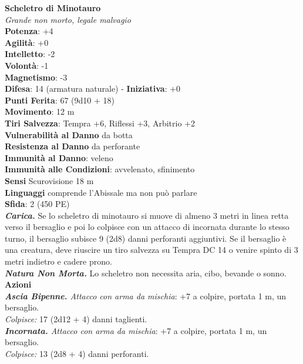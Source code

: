 \begin{multicols}{2}
\medskip\textbf{Scheletro di Minotauro}\\
\emph{Grande non morto, legale malvagio}\\
\textbf{Potenza}: +4\\
\textbf{Agilità}: +0\\
\textbf{Intelletto}: -2\\
\textbf{Volontà}: -1\\
\textbf{Magnetismo}: -3\\
\textbf{Difesa}: 14 (armatura naturale) - \textbf{Iniziativa}: +0\\
\textbf{Punti Ferita}: 67 (9d10 + 18)\\
\textbf{Movimento}: 12 m\\
\textbf{Tiri Salvezza}: Tempra +6, Riflessi +3, Arbitrio +2\\
\textbf{Vulnerabilità al Danno} da botta\\
\textbf{Resistenza al Danno} da perforante\\
\textbf{Immunità al Danno}: veleno\\
\textbf{Immunità alle Condizioni}: avvelenato, sfinimento\\
\textbf{Sensi} Scurovisione 18 m\\
\textbf{Linguaggi} comprende l'Abissale ma non può parlare\\
\textbf{Sfida}: 2 (450 PE)\smallskip\\
\emph{\textbf{Carica.}} Se lo scheletro di minotauro si muove di almeno 3 metri in linea retta verso il bersaglio e poi lo colpisce con un attacco di incornata durante lo stesso turno, il bersaglio subisce 9 (2d8) danni perforanti aggiuntivi. Se il bersaglio è una creatura, deve riuscire un tiro salvezza su Tempra DC 14 o venire spinto di 3 metri indietro e cadere prono.\\
\emph{\textbf{Natura Non Morta.}} Lo scheletro non necessita aria, cibo, bevande o sonno.\\
\smallskip\textbf{Azioni}\\
\emph{\textbf{Ascia Bipenne.} Attacco con arma da mischia}: +7 a colpire, portata 1 m, un bersaglio.\\
\emph{Colpisce:} 17 (2d12 + 4) danni taglienti.\\
\emph{\textbf{Incornata.} Attacco con arma da mischia}: +7 a colpire, portata 1 m, un bersaglio.\\
\emph{Colpisce:} 13 (2d8 + 4) danni perforanti.\\


\end{multicols}
